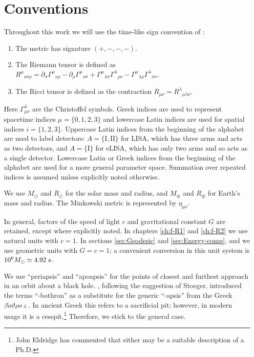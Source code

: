 \chapter{Conventions}
\label{conventions}

Throughout this work we will use the time-like sign convention of \citet{Landau1975}:
\begin{enumerate}
\item The metric has signature $(+,-,-,-)$.
\item The Riemann tensor is defined as ${R^\mu}_{\nu\sigma\rho} = \partial_\sigma {\Gamma^\mu}_{\nu\rho} - \partial_\rho {\Gamma^\mu}_{\nu\sigma} + {\Gamma^\mu}_{\lambda\sigma}{\Gamma^\lambda}_{\rho\nu} - {\Gamma^\mu}_{\lambda\rho}{\Gamma^\lambda}_{\sigma\nu}$.
\item The Ricci tensor is defined as the contraction $R_{\mu\nu} = {R^\lambda}_{\mu\lambda\nu}$.
\end{enumerate}
Here $\Gamma^\lambda_{\mu\nu}$ are the Christoffel symbols. Greek indices are used to represent spacetime indices $\mu = \{0,1,2,3\}$ %
and lowercase Latin indices are used for spatial indices $i = \{1,2,3\}$. Uppercase Latin indices from the beginning of the alphabet are used to label detectors: $A = \{\mathrm{I}, \mathrm{II}\}$ for LISA, which has three arms and acts as two detectors, and $A = \{\mathrm{I}\}$ for eLISA, which has only two arms and so acts as a single detector. Lowercase Latin or Greek indices from the beginning of the alphabet are used for a more general parameter space. Summation over repeated indices is assumed unless explicitly noted otherwise.

We use $M_\odot$ and $R_\odot$ for the solar mass and radius, and $M_\oplus$ and $R_\oplus$ for Earth's mass and radius. The Minkowski metric is represented by $\eta_{\mu\nu}$.

In general, factors of the speed of light $c$ and gravitational constant $G$ are retained, except where explicitly noted. In chapters \ref{ch:f-R1} and \ref{ch:f-R2} we use natural units with $c = 1$. In sections \ref{sec:Geodesic} and \ref{sec:Energy-comp},  and  we use geometric units with $G = c = 1$; a convenient conversion in this unit system is $10^6 M_\odot \simeq 4.92~\mathrm{s}$.

We use ``periapsis'' and ``apoapsis'' for the points of closest and furthest approach in an orbit about a black hole. \citet{Frank1976}, following the suggestion of Stoeger, introduced the terms ``-bothron'' as a substitute for the generic ``-apsis'' from the Greek {$\mathit{\beta\acute{o}\vartheta\rho o \varsigma}$}. In ancient Greek this refers to a sacrificial pit; however, in modern usage it is a cesspit.\footnote{John Eldridge has commented that either may be a suitable description of a Ph.D.} Therefore, we stick to the general case.